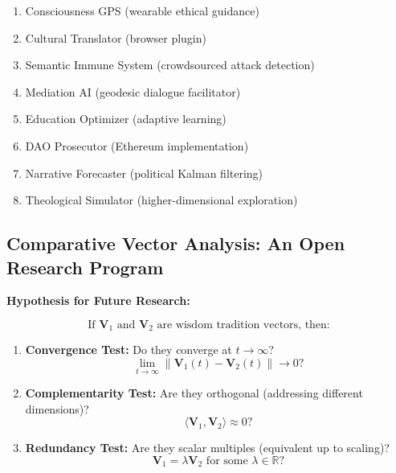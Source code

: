 \documentclass[11pt,a4paper]{article}
\theoremstyle{definition}
\theoremstyle{remark}
\newcommand{\RR}{\mathbb{R}}
\begin{document}
\begin{small}
\begin{enumerate}[label=\textbf{T\arabic*:}]
\item Consciousness GPS (wearable ethical guidance)
\item Cultural Translator (browser plugin)
\item Semantic Immune System (crowdsourced attack detection)
\item Mediation AI (geodesic dialogue facilitator)
\item Education Optimizer (adaptive learning)
\item DAO Prosecutor (Ethereum implementation)
\item Narrative Forecaster (political Kalman filtering)
\item Theological Simulator (higher-dimensional exploration)
\end{enumerate}


\subsection{Comparative Vector Analysis: An Open Research Program}

\textbf{Hypothesis for Future Research:}

\begin{equation}
\text{If } \mathbf{V}_1 \text{ and } \mathbf{V}_2 \text{ are wisdom tradition vectors, then:}
\end{equation}

\begin{enumerate}
\item \textbf{Convergence Test:} Do they converge at $t \to \infty$?
\begin{equation}
\lim_{t \to \infty} \|\mathbf{V}_1(t) - \mathbf{V}_2(t)\| \to 0 ?
\end{equation}

\item \textbf{Complementarity Test:} Are they orthogonal (addressing different dimensions)?
\begin{equation}
\langle \mathbf{V}_1, \mathbf{V}_2 \rangle \approx 0 ?
\end{equation}

\item \textbf{Redundancy Test:} Are they scalar multiples (equivalent up to scaling)?
\begin{equation}
\mathbf{V}_1 = \lambda \mathbf{V}_2 \text{ for some } \lambda \in \RR ?
\end{equation}
\end{enumerate}


\end{small}
\end{document}
